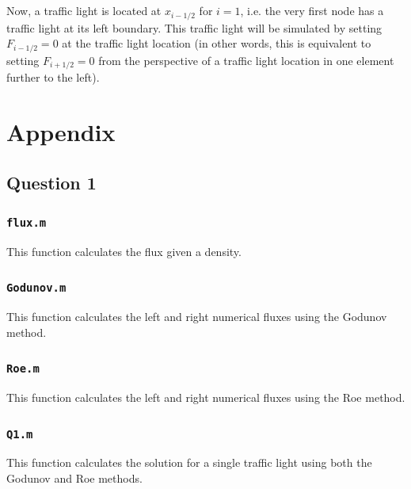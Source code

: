 \documentclass[10pt]{article}
\begin{document}
\section{}
Now, a traffic light is located at \(x_{i-1/2}\) for \(i=1\), i.e. the very first node has a traffic light at its left boundary. This traffic light will be simulated by setting \(F_{i-1/2}=0\) at the traffic light location (in other words, this is equivalent to setting \(F_{i+1/2}=0\) from the perspective of a traffic light location in one element further to the left). 





\section{Appendix}
\subsection{Question 1}
\subsubsection{{\tt flux.m}}
This function calculates the flux given a density.

\subsubsection{{\tt Godunov.m}}
This function calculates the left and right numerical fluxes using the Godunov method.

\subsubsection{{\tt Roe.m}}
This function calculates the left and right numerical fluxes using the Roe method.

\subsubsection{{\tt Q1.m}}
This function calculates the solution for a single traffic light using both the Godunov and Roe methods.

\end{document}
